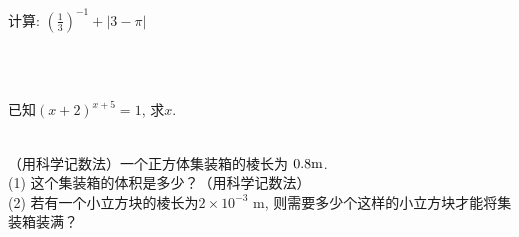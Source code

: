 \\ \\
\item{
    计算: $ (\frac{1}{3})^{-1} + \lvert 3-\pi \rvert $
    \iffalse
    \fangsong\zihao{4}
    思路: 去绝对值符号,运算到底.

    解答: 
    \begin{align*}
        \mbox{原式} &= 3 + \pi - 3\\
        &= \pi.
    \end{align*}
    \fi
}
\\ \\
\item{
    已知$(x+2)^{x+5}=1$, 求$x$.
}
\\ \\
\item{
    （用科学记数法）一个正方体集装箱的棱长为 $0.8 \rm{m}$.\\
    (1) 这个集装箱的体积是多少？（用科学记数法）\\
    (2) 若有一个小立方块的棱长为$2\times 10^{-3} $ m, 则需要多少个这样的小立方块才能将集装箱装满？
    \iffalse
    \fangsong\zihao{4}
    思路: 问题（2）注意简便运算.
    \fi
}
\\ \\ \\